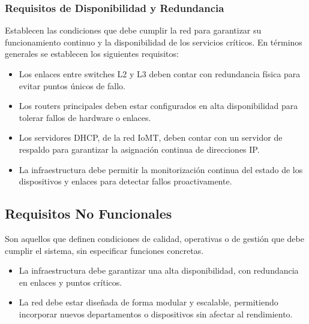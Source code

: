 \subsubsection{Requisitos de Disponibilidad y Redundancia}
Establecen las condiciones que debe cumplir la red para garantizar su funcionamiento continuo y la disponibilidad de los servicios críticos. En términos generales se establecen los siguientes requisitos:
\begin{itemize}
    \item Los enlaces entre switches L2 y L3 deben contar con redundancia física para evitar puntos únicos de fallo.
    \item Los routers principales deben estar configurados en alta disponibilidad para tolerar fallos de hardware o enlaces.
    \item Los servidores DHCP, de la red IoMT, deben contar con un servidor de respaldo para garantizar la asignación continua de direcciones IP.
    \item La infraestructura debe permitir la monitorización continua del estado de los dispositivos y enlaces para detectar fallos proactivamente.
\end{itemize}

\subsection{Requisitos No Funcionales}
Son aquellos que definen condiciones de calidad, operativas o de gestión que debe cumplir el sistema, sin especificar funciones concretas.
\begin{itemize}
    \item La infraestructura debe garantizar una alta disponibilidad, con redundancia en enlaces y puntos críticos.
    \item La red debe estar diseñada de forma modular y escalable, permitiendo incorporar nuevos departamentos o dispositivos sin afectar al rendimiento.
\end{itemize}





